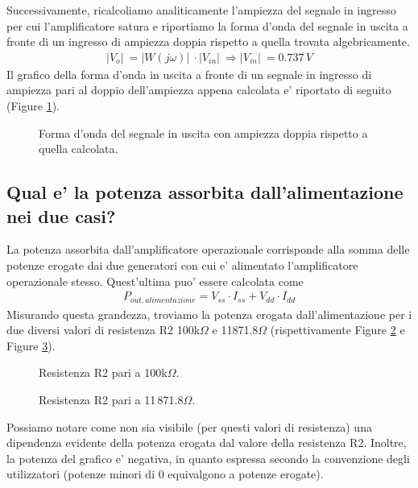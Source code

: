 \documentclass[a4paper,10pt]{article}
\begin{document}
Successivamente, ricalcoliamo analiticamente l'ampiezza del segnale in ingresso per cui l'amplificatore satura e riportiamo la forma d'onda del segnale in uscita a fronte di un ingresso di ampiezza doppia rispetto a quella trovata algebricamente.
\begin{align*}
\lvert V_o \rvert\ = \lvert W(j\omega) \rvert\ \cdot \lvert V_{in} \rvert\ \Rightarrow \lvert V_{in} \rvert\ = 0.737\,V
\end{align*}
Il grafico della forma d'onda in uscita a fronte di un segnale in ingresso di ampiezza pari al doppio dell'ampiezza appena calcolata e' riportato di seguito (Figure \ref{fig:plottaglior2}).
\begin{figure}[h!]
	\centering
  	\caption{Forma d'onda del segnale in uscita con ampiezza doppia rispetto a quella calcolata.}
  	\label{fig:plottaglior2}
\end{figure}

\newpage

\subsection{Qual e' la potenza assorbita dall'alimentazione nei due casi?}
La potenza assorbita dall'amplificatore operazionale corrisponde alla somma delle potenze erogate dai due generatori con cui e' alimentato l'amplificatore operazionale stesso. Quest'ultima puo' essere calcolata come
\begin{align*}
P_{out, alimentazione} = V_{ss} \cdot I_{ss} + V_{dd} \cdot I_{dd}
\end{align*}
Misurando questa grandezza, troviamo la potenza erogata dall'alimentazione per i due diversi valori di resistenza R2 100k$\Omega$ e 11871.8$\Omega$ (rispettivamente Figure \ref{fig:pow1} e Figure \ref{fig:pow2}).

\begin{figure}[h!]
	\centering
  	\caption{Resistenza R2 pari a 100k$\Omega$.}
  	\label{fig:pow1}
\end{figure}

\begin{figure}[h!]
	\centering
  	\caption{Resistenza R2 pari a 11\,871.8$\Omega$.}
  	\label{fig:pow2}
\end{figure}

Possiamo notare come non sia visibile (per questi valori di resistenza) una dipendenza evidente della potenza erogata dal valore della resistenza R2. Inoltre, la potenza del grafico e' negativa, in quanto espressa secondo la convenzione degli utilizzatori (potenze minori di 0 equivalgono a potenze erogate).
\end{document}
